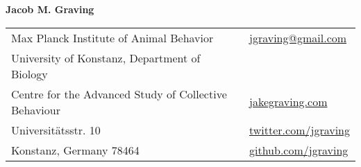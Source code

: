 \documentclass[letterpaper,10pt,oneside]{article}
\begin{document}

\LARGE{\textbf{Jacob M. Graving}}  \\
\normalsize



\begin{center}
\begin{tabular}{l l}
 Max Planck Institute of Animal Behavior		& \hspace{2in} \href{mailto:jgraving@gmail.com}{\faEnvelope{ } jgraving@gmail.com} \\
 University of Konstanz, Department of Biology	& \hspace{2in}  \\ %
  Centre for the Advanced Study of Collective Behaviour    & \hspace{2in}  \href{http://jakegraving.com/}{\faGlobe{ } jakegraving.com}   \\
  Universit\"{a}tsstr. 10  & \hspace{2in}  \href{https://twitter.com/jgraving}{\faTwitter{ }  twitter.com/jgraving}   \\
   Konstanz, Germany 78464         & \hspace{2in} \href{https://github.com/jgraving}{\faGithub{ }  github.com/jgraving} \\
 
\end{tabular}
\end{center}
\end{document}
